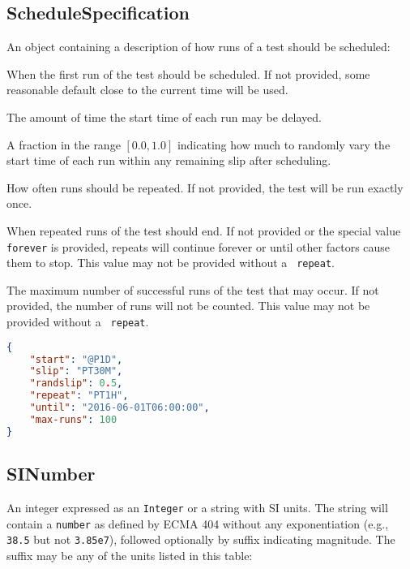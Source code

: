 \documentclass[10pt]{article}
\begin{document}
\subsection{ScheduleSpecification}
An object containing a description of how runs of a test should be scheduled:

 When the first run of the
test should be scheduled.  If not provided, some reasonable default
close to the current time will be used.

 The amount of time the start time of each
run may be delayed.

 A fraction in the range $[0.0, 1.0]$
indicating how much to randomly vary the start time of each run within
any remaining slip after scheduling.

 How often runs should be repeated.  If
not provided, the test will be run exactly once.

 When repeated runs of the
test should end.  If not provided or the special value {\tt forever}
is provided, repeats will continue forever or until other factors
cause them to stop.  This value may not be provided without a {\tt
  repeat}.

 The maximum number of successful runs
of the test that may occur.  If not provided, the number of runs will
not be counted.  This value may not be provided without a {\tt
  repeat}.

\example
\begin{lstlisting}[language=json]
{
    "start": "@P1D",
    "slip": "PT30M",
    "randslip": 0.5,
    "repeat": "PT1H",
    "until": "2016-06-01T06:00:00",
    "max-runs": 100
}
\end{lstlisting}


\subsection{SINumber}
An integer expressed as an {\tt Integer} or a string with SI units.
The string will contain a {\tt number} as defined by ECMA 404 without
any exponentiation (e.g., {\tt 38.5} but not {\tt 3.85e7}), followed
optionally by suffix indicating magnitude.  The suffix may be any of
the units listed in this table:
\end{document}

